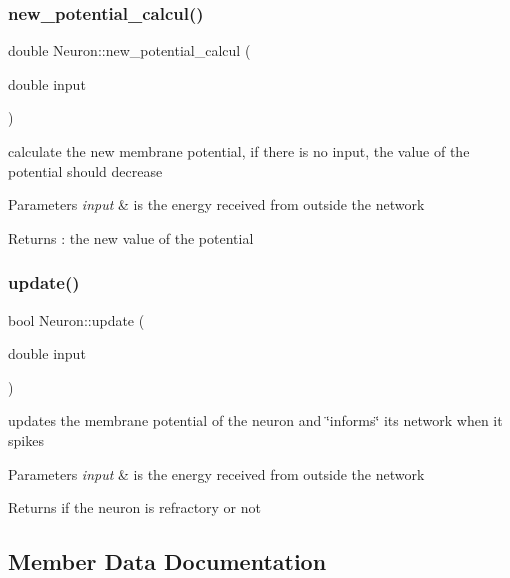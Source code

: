 \subsubsection{\texorpdfstring{new\+\_\+potential\+\_\+calcul()}{new\_potential\_calcul()}}
{\footnotesize\ttfamily double Neuron\+::new\+\_\+potential\+\_\+calcul (\begin{DoxyParamCaption}\item[{double}]{input }\end{DoxyParamCaption})}

calculate the new membrane potential, if there is no input, the value of the potential should decrease 
\begin{DoxyParams}{Parameters}
{\em input} & is the energy received from outside the network \\
\hline
\end{DoxyParams}
\begin{DoxyReturn}{Returns}
\+: the new value of the potential 
\end{DoxyReturn}
\mbox{\label{class_neuron_abad446d547800d3ba15a2da374fe409e}} 
\subsubsection{\texorpdfstring{update()}{update()}}
{\footnotesize\ttfamily bool Neuron\+::update (\begin{DoxyParamCaption}\item[{double}]{input }\end{DoxyParamCaption})}

updates the membrane potential of the neuron and \char`\"{}informs\char`\"{} its network when it spikes 
\begin{DoxyParams}{Parameters}
{\em input} & is the energy received from outside the network \\
\hline
\end{DoxyParams}
\begin{DoxyReturn}{Returns}
if the neuron is refractory or not 
\end{DoxyReturn}


\subsection{Member Data Documentation}
\mbox{\label{class_neuron_aa8becbf43a8a371a89d00ebf9c79ff88}} 
